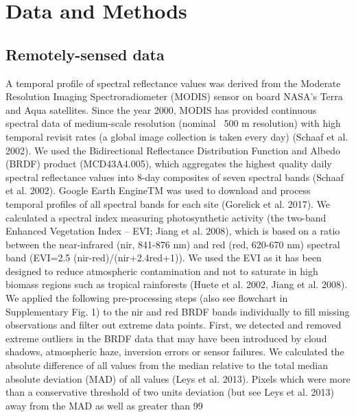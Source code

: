 {\section{Data and Methods}
\subsection{Remotely-sensed data}
A temporal profile of spectral reflectance values was derived from the Moderate Resolution Imaging Spectroradiometer (MODIS) sensor on board NASA’s Terra and Aqua satellites. Since the year 2000, MODIS has provided continuous spectral data of medium-scale resolution (nominal ~500 m resolution) with high temporal revisit rates (a global image collection is taken every day) (Schaaf et al. 2002). We used the Bidirectional Reflectance Distribution Function and Albedo (BRDF) product (MCD43A4.005), which aggregates the highest quality daily spectral reflectance values into 8-day composites of seven spectral bands (Schaaf et al. 2002). Google Earth EngineTM was used to download and process temporal profiles of all spectral bands for each site (Gorelick et al. 2017). We calculated a spectral index measuring photosynthetic activity (the two-band Enhanced Vegetation Index – EVI; Jiang et al. 2008), which is based on a ratio between the near-infrared (nir, 841-876 nm) and red (red, 620-670 nm) spectral band (EVI=2.5 (nir-red)/(nir+2.4red+1)). We used the EVI as it has been designed to reduce atmospheric contamination and not to saturate in high biomass regions such as tropical rainforests (Huete et al. 2002, Jiang et al. 2008). We applied the following pre-processing steps (also see flowchart in Supplementary Fig. 1) to the nir and red BRDF bands individually to fill missing observations and filter out extreme data points. 
First, we detected and removed extreme outliers in the BRDF data that may have been introduced by cloud shadows, atmospheric haze, inversion errors or sensor failures. We calculated the absolute difference of all values from the median relative to the total median absolute deviation (MAD) of all values (Leys et al. 2013). Pixels which were more than a conservative threshold of two units deviation (but see Leys et al. 2013) away from the MAD as well as greater than 99 %
}
